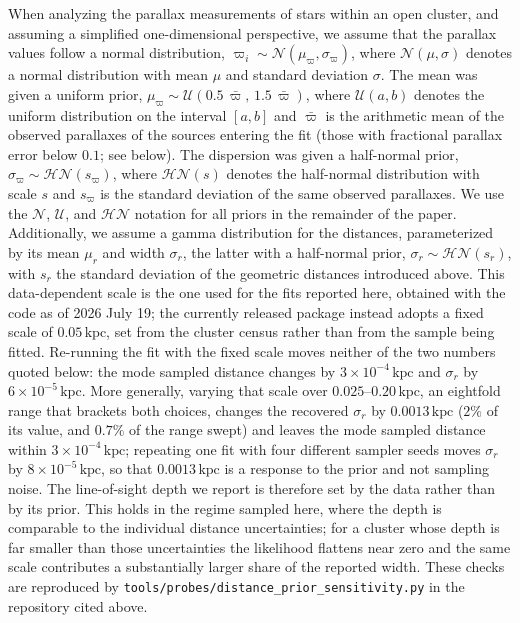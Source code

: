 \documentclass{aa}
\begin{document}
When analyzing the parallax measurements of stars within an open cluster, and assuming a simplified one-dimensional perspective, we assume that the parallax values follow a normal distribution, $\varpi_i \sim \mathcal{N}(\mu_\varpi,\sigma_\varpi)$, where $\mathcal{N}(\mu,\sigma)$ denotes a normal distribution with mean $\mu$ and standard deviation $\sigma$. The mean was given a uniform prior, $\mu_\varpi \sim \mathcal{U}(0.5\,\bar{\varpi},\,1.5\,\bar{\varpi})$, where $\mathcal{U}(a,b)$ denotes the uniform distribution on the interval $[a,b]$ and $\bar{\varpi}$ is the arithmetic mean of the observed parallaxes of the sources entering the fit (those with fractional parallax error below $0.1$; see below). The dispersion was given a half-normal prior, $\sigma_\varpi \sim \mathcal{HN}(s_\varpi)$, where $\mathcal{HN}(s)$ denotes the half-normal distribution with scale $s$ and $s_\varpi$ is the standard deviation of the same observed parallaxes. We use the $\mathcal{N}$, $\mathcal{U}$, and $\mathcal{HN}$ notation for all priors in the remainder of the paper. Additionally, we assume a gamma distribution for the distances, parameterized by its mean $\mu_r$ and width $\sigma_r$, the latter with a half-normal prior, $\sigma_r \sim \mathcal{HN}(s_r)$, with $s_r$ the standard deviation of the geometric distances introduced above. This data-dependent scale is the one used for the fits reported here, obtained with the code as of 2026 July 19; the currently released package instead adopts a fixed scale of $0.05\,\mathrm{kpc}$, set from the \citet{2024arXiv240305143H} cluster census rather than from the sample being fitted. Re-running the fit with the fixed scale moves neither of the two numbers quoted below: the mode sampled distance changes by $3\times10^{-4}\,\mathrm{kpc}$ and $\sigma_r$ by $6\times10^{-5}\,\mathrm{kpc}$. More generally, varying that scale over $0.025$--$0.20\,\mathrm{kpc}$, an eightfold range that brackets both choices, changes the recovered $\sigma_r$ by $0.0013\,\mathrm{kpc}$ ($2\%$ of its value, and $0.7\%$ of the range swept) and leaves the mode sampled distance within $3\times10^{-4}\,\mathrm{kpc}$; repeating one fit with four different sampler seeds moves $\sigma_r$ by $8\times10^{-5}\,\mathrm{kpc}$, so that $0.0013\,\mathrm{kpc}$ is a response to the prior and not sampling noise. The line-of-sight depth we report is therefore set by the data rather than by its prior. This holds in the regime sampled here, where the depth is comparable to the individual distance uncertainties; for a cluster whose depth is far smaller than those uncertainties the likelihood flattens near zero and the same scale contributes a substantially larger share of the reported width. These checks are reproduced by \texttt{tools/probes/distance\_prior\_sensitivity.py} in the repository cited above.
\end{document}
